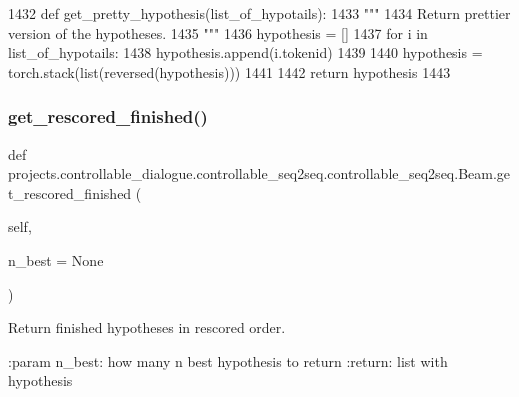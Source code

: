 \begin{DoxyCode}
1432     \textcolor{keyword}{def }get\_pretty\_hypothesis(list\_of\_hypotails):
1433         \textcolor{stringliteral}{"""}
1434 \textcolor{stringliteral}{        Return prettier version of the hypotheses.}
1435 \textcolor{stringliteral}{        """}
1436         hypothesis = []
1437         \textcolor{keywordflow}{for} i \textcolor{keywordflow}{in} list\_of\_hypotails:
1438             hypothesis.append(i.tokenid)
1439 
1440         hypothesis = torch.stack(list(reversed(hypothesis)))
1441 
1442         \textcolor{keywordflow}{return} hypothesis
1443 
\end{DoxyCode}
\mbox{\label{classprojects_1_1controllable__dialogue_1_1controllable__seq2seq_1_1controllable__seq2seq_1_1Beam_a9cea6bd5feecf982564b84d0b774e1c1}} 
\subsubsection{\texorpdfstring{get\+\_\+rescored\+\_\+finished()}{get\_rescored\_finished()}}
{\footnotesize\ttfamily def projects.\+controllable\+\_\+dialogue.\+controllable\+\_\+seq2seq.\+controllable\+\_\+seq2seq.\+Beam.\+get\+\_\+rescored\+\_\+finished (\begin{DoxyParamCaption}\item[{}]{self,  }\item[{}]{n\+\_\+best = {\ttfamily None} }\end{DoxyParamCaption})}

\begin{DoxyVerb}Return finished hypotheses in rescored order.

:param n_best:
    how many n best hypothesis to return
:return:
    list with hypothesis
\end{DoxyVerb}
 

